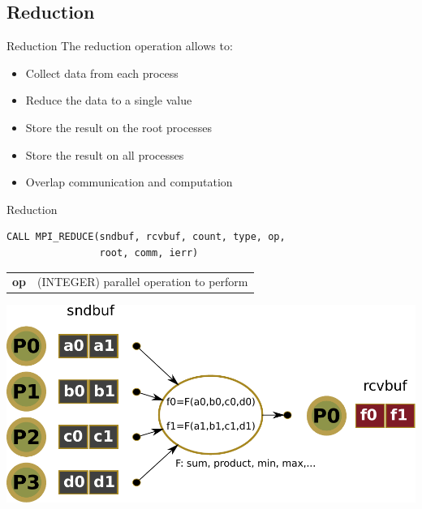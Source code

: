 \documentclass[aspectratio=43]{beamer}
\begin{document}
\subsection{Reduction}
\begin{frame}{Reduction}
The reduction operation allows to:
\begin{itemize}
\item Collect data from each process
\item Reduce the data to a single value
\item Store the result on the root processes
\item Store the result on all processes
\item Overlap communication and computation
\end{itemize}
\end{frame}

\begin{frame}[fragile]{Reduction}
\begin{verbatim}
CALL MPI_REDUCE(sndbuf, rcvbuf, count, type, op, 
                root, comm, ierr)
\end{verbatim}
\normalsize
\begin{black1block}{}
\begin{tabular}{rp{8cm}}
\textbf{op} & (INTEGER) parallel operation to perform\\
\end{tabular}
\end{black1block}
\begin{center}
\includegraphics[scale=0.5]{03.MPI_Coll/reduce.pdf}
\end{center}
\end{frame}
\end{document}
